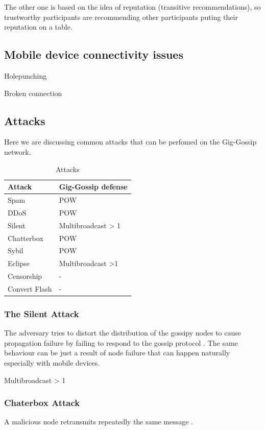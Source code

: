 \documentclass{article}
\begin{document}
The other one is based on the idea of reputation (transitive recommendations), so trustworthy participants are recommending other participants puting their reputation on a table.

\subsection{Mobile device connectivity issues}


Holepunching \cite{HolePunching}

Broken connection

\subsection{Attacks}
Here we are discussing common attacks that can be perfomed on the Gig-Gossip network.


\begin{table}  
	\centering
	\begin{tabular}{ll}
		\toprule
		Attack         & Gig-Gossip defense \\
		\midrule
		Spam           & POW \\
		DDoS           & POW \\
		Silent         & Multibroadcast > 1 \\
		Chatterbox     & POW \\
		Sybil          & POW \\
		Eclipse        & Multibroadcast >1 \\
		Censorship     & - \\
		Convert Flash  & - \\
		\bottomrule
	\end{tabular}
	\label{tab:attacks}
	\caption{Attacks}
\end{table}


\subsubsection{The Silent Attack}
The adversary tries to distort the distribution of the gossipy nodes to cause propagation failure by failing to respond to the gossip protocol \cite{AdHocNet}. The same behaviour can be just a result of node failure that can happen naturally especially with mobile devices.

Multibroadcast > 1


\subsubsection{Chaterbox Attack}
A malicious node retransmits repeatedly the same message \cite{AdHocNet}.
\end{document}
